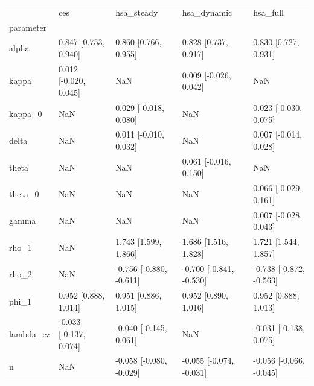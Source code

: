 \begin{tabular}{lllll}
\toprule
 & ces & hsa\_steady & hsa\_dynamic & hsa\_full \\
parameter &  &  &  &  \\
\midrule
alpha & 0.847 [0.753, 0.940] & 0.860 [0.766, 0.955] & 0.828 [0.737, 0.917] & 0.830 [0.727, 0.931] \\
kappa & 0.012 [-0.020, 0.045] & NaN & 0.009 [-0.026, 0.042] & NaN \\
kappa\_0 & NaN & 0.029 [-0.018, 0.080] & NaN & 0.023 [-0.030, 0.075] \\
delta & NaN & 0.011 [-0.010, 0.032] & NaN & 0.007 [-0.014, 0.028] \\
theta & NaN & NaN & 0.061 [-0.016, 0.150] & NaN \\
theta\_0 & NaN & NaN & NaN & 0.066 [-0.029, 0.161] \\
gamma & NaN & NaN & NaN & 0.007 [-0.028, 0.043] \\
rho\_1 & NaN & 1.743 [1.599, 1.866] & 1.686 [1.516, 1.828] & 1.721 [1.544, 1.857] \\
rho\_2 & NaN & -0.756 [-0.880, -0.611] & -0.700 [-0.841, -0.530] & -0.738 [-0.872, -0.563] \\
phi\_1 & 0.952 [0.888, 1.014] & 0.951 [0.886, 1.015] & 0.952 [0.890, 1.016] & 0.952 [0.888, 1.013] \\
lambda\_ez & -0.033 [-0.137, 0.074] & -0.040 [-0.145, 0.061] & NaN & -0.031 [-0.138, 0.075] \\
n & NaN & -0.058 [-0.080, -0.029] & -0.055 [-0.074, -0.031] & -0.056 [-0.066, -0.045] \\
\bottomrule
\end{tabular}
